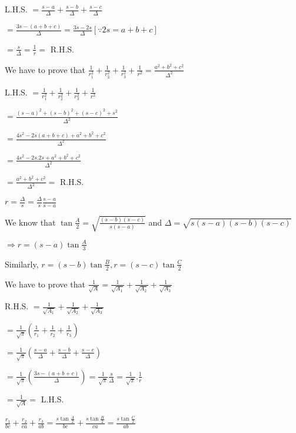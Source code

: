   L.H.S. $= \frac{s - a}{\Delta} + \frac{s - b}{\Delta} + \frac{s - c}{\Delta}$

  $= \frac{3s - (a + b + c)}{\Delta} = \frac{3s - 2s}{\Delta} [\because 2s = a + b + c]$

  $= \frac{s}{\Delta} = \frac{1}{r} =$ R.H.S.

\item We have to prove that $\frac{1}{r_1^2} + \frac{1}{r_2^2} + \frac{1}{r_3^2} + \frac{1}{r^2} = \frac{a^2 + b^2 +
  c^2}{\Delta^2}$

  L.H.S. $= \frac{1}{r_1^2} + \frac{1}{r_2^2} + \frac{1}{r_3^2} + \frac{1}{r^2}$

  $= \frac{(s - a)^2 + (s - b)^2 + (s - c)^2 + s^2}{\Delta^2}$

  $= \frac{4s^2 - 2s(a + b + c) + a^2 + b^2 + c^2}{\Delta^2}$

  $=\frac{4s^2 - 2s.2s + a^2 + b^2 + c^2}{\Delta^2}$

  $= \frac{a^2 + b^2 + c^2}{\Delta^2} =$ R.H.S.

\item $r = \frac{\Delta}{s} = \frac{\Delta}{s}\frac{s - a}{s - a}$

  We know that $\tan \frac{A}{2} = \sqrt{\frac{(s - b)(s - c)}{s(s - a)}}$ and $\Delta = \sqrt{s(s - a)(s - b)(s -
    c)}$

  $\Rightarrow r = (s - a)\tan\frac{A}{3}$

  Similarly, $r = (s - b)\tan\frac{B}{2}, r = (s - c)\tan\frac{C}{2}$

\item We have to prove that $\frac{1}{\sqrt{A}} = \frac{1}{\sqrt{A_1}} + \frac{1}{\sqrt{A_2}} + \frac{1}{\sqrt{A_3}}$

  R.H.S. $= \frac{1}{\sqrt{A_1}} + \frac{1}{\sqrt{A_2}} + \frac{1}{\sqrt{A_3}}$

  $= \frac{1}{\sqrt{\pi}}\left(\frac{1}{r_1} + \frac{1}{r_2} + \frac{1}{r_3}\right)$

  $=\frac{1}{\sqrt{\pi}}\left(\frac{s - a}{\Delta} + \frac{s - b}{\Delta} + \frac{s - c}{\Delta}\right)$

  $= \frac{1}{\sqrt{\pi}}\left(\frac{3s - (a + b + c)}{\Delta}\right) = \frac{1}{\sqrt{\pi}}\frac{s}{\Delta} =
  \frac{1}{\sqrt{\pi}}.\frac{1}{r}$

  $= \frac{1}{\sqrt{A}} =$ L.H.S.

\item $\frac{r_1}{bc} + \frac{r_2}{ca} + \frac{r_3}{ab} = \frac{s\tan\frac{A}{2}}{bc} + \frac{s\tan\frac{B}{2}}{ca} =
  \frac{s\tan\frac{C}{2}}{ab}$

